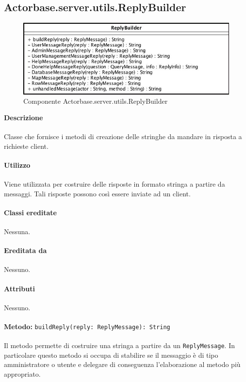 \documentclass[a4paper]{article}
\begin{document}
	\subsection{Actorbase.server.utils.ReplyBuilder}
		\begin{figure}[H]
			\centering
			\includegraphics[width=\textwidth]{Server/replayBClass.jpg}
			\caption{Componente Actorbase.server.utils.ReplyBuilder}
		\end{figure}
		\textbf{Descrizione}
			\\ \\
			Classe che fornisce i metodi di creazione delle stringhe da mandare in risposta a richieste client.
			\\ \\
		\textbf{Utilizzo}
			\\ \\
			Viene utilizzata per costruire delle risposte in formato stringa a partire da messaggi. Tali risposte possono così essere inviate ad un client.
			\\ \\
		\textbf{Classi ereditate}
			\\ \\
			Nessuna.
			\\ \\
		\textbf{Ereditata da}
			\\ \\
			Nessuno.
			\\ \\
		\textbf{Attributi}
			\\ \\
			Nessuno.
			\\ \\
		\textbf{Metodo: }\texttt{buildReply(reply: ReplyMessage): String}
			\\ \\
			Il metodo permette di costruire una stringa a partire da un \texttt{ReplyMessage}. In particolare questo metodo si occupa di stabilire se il messaggio è di tipo amministratore o utente e delegare di conseguenza l'elaborazione al metodo più appropriato.
\end{document}
